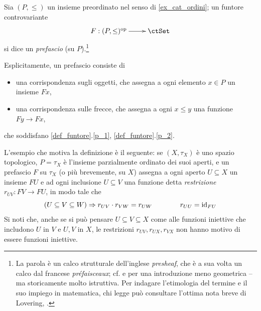 \begin{definition}\label{exa_funtori_da_poset}
 Sia \((P,\le)\) un insieme preordinato nel senso di \ref{ex_cat_ordini}; un funtore controvariante
 \[\xymatrix{F : (P,\le)^\op \ar[r] & \ctSet}\]
 si dice un \emph{prefascio} (su \(P\)).\footnote{La parola è un calco strutturale dell'inglese \emph{presheaf}, che è a sua volta un calco dal francese \emph{préfaisceaux}; cf. \cite{Tennison1975,Bredon1997,Godement} e \cite[Cap. VII]{pedicchiofoundations} per una introduzione meno geometrica --ma storicamente molto istruttiva. Per indagare l'etimologia del termine e il suo impiego in matematica, chi legge può consultare l'ottima nota breve di Lovering, \cite{Lovering}.}

 Esplicitamente, un prefascio consiste di
 \begin{itemize}
  \item una corrispondenza sugli oggetti, che assegna a ogni elemento \(x\in P\) un insieme \(Fx\),
  \item una corrispondenza sulle frecce, che assegna a ogni \(x\le y\) una funzione \(Fy\to Fx\),
 \end{itemize}
 che soddisfano \ref{def_funtore}.\ref{p_1}, \ref{def_funtore}.\ref{p_2}.
\end{definition}
L'esempio che motiva la definizione è il seguente: se \((X,\tau_X)\) è uno spazio topologico, \(P=\tau_X\) è l'insieme parzialmente ordinato dei suoi aperti, e un prefascio \(F\) su \(\tau_X\) (o più brevemente, su \(X\)) assegna a ogni aperto \(U\subseteq X\) un insieme \(FU\) e ad ogni inclusione \(U\subseteq V\) una funzione detta \emph{restrizione} \(r_{UV} \colon FV \to FU\), in modo tale che
\[(U\subseteq V\subseteq W) \Rightarrow r_{UV}\cdot r_{VW} = r_{UW} \qquad\qquad r_{UU} = \mathrm{id}_{FU}\]
Si noti che, anche se si può pensare \(U\subseteq V\subseteq X\) come alle funzioni iniettive che includono \(U\) in \(V\) e \(U,V\) in \(X\), le restrizioni \(r_{UV}, r_{UX}, r_{VX}\) non hanno motivo di essere funzioni iniettive.

